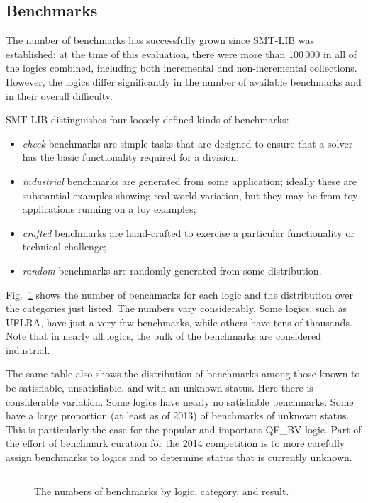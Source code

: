 \documentclass[smallcondensed]{svjour3}
\begin{document}
\subsection{Benchmarks}
\label{Benchmarks}

The number of benchmarks has successfully grown since SMT-LIB was established; at the time of this evaluation, there were more than 100\,000 in all of the logics combined, including both incremental and non-incremental collections. However, the logics differ significantly in the number of available benchmarks and in their overall difficulty.

SMT-LIB distinguishes four loosely-defined kinds of benchmarks:
\begin{itemize}[noitemsep,nolistsep]
\item {\em check} benchmarks are simple tasks that are designed to ensure that a solver has the basic functionality required for a division;
\item {\em industrial} benchmarks are generated from some application; ideally these are substantial examples showing real-world variation, but they may be from toy applications running on a toy examples;
\item {\em crafted} benchmarks are hand-crafted to exercise a particular functionality or technical challenge;
\item {\em random} benchmarks are randomly generated from some distribution.
\end{itemize}
Fig.~\ref{Fig:category} shows the number of benchmarks for each logic and the distribution over the categories just listed. The numbers vary considerably. Some logics, such as UFLRA, have just a very few benchmarks, while others have tens of thousands. Note that in nearly all logics, the bulk of the benchmarks are 
considered industrial.

The same table also shows the distribution of benchmarks among those known to be satisfiable, unsatisfiable, and with an unknown status. Here there is 
considerable variation. Some logics have nearly no satisfiable benchmarks. Some have a large proportion (at least as of 2013) of benchmarks of unknown status.
This is particularly the case for the popular and important QF\_BV logic.
Part of the effort of benchmark curation for the 2014 competition is to more carefully assign benchmarks to logics and to determine status that is currently unknown.

\begin{figure}
\centering
\begin{tabular}{|l|r|p{.45in}p{.3in}p{.35in}p{.25in}|p{.25in}p{.25in}p{.4in}|}
\hline

\end{tabular}
\caption{The numbers of benchmarks by logic, category, and result.}
\label{Fig:category}
\end{figure}
\end{document}
